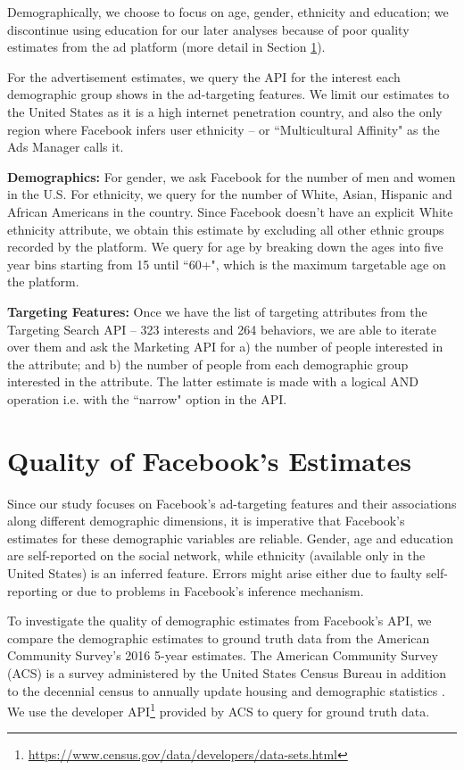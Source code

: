 Demographically, we choose to focus on age, gender, ethnicity and education; we discontinue using education for our later analyses because of poor quality estimates from the ad platform (more detail in Section \ref{sec:fb_quality}).

For the advertisement estimates, we query the API for the interest each demographic group shows in the ad-targeting features. We limit our estimates to the United States as it is a high internet penetration country, and also the only region where Facebook infers user ethnicity -- or ``Multicultural Affinity" as the Ads Manager calls it.

\textbf{Demographics:} For gender, we ask Facebook for the number of men and women in the U.S. For ethnicity, we query for the number of White, Asian, Hispanic and African Americans in the country. Since Facebook doesn't have an explicit White ethnicity attribute, we obtain this estimate by excluding all other ethnic groups recorded by the platform. We query for age by breaking down the ages into five year bins starting from 15 until ``60+", which is the maximum targetable age on the platform.

\textbf{Targeting Features:} Once we have the list of targeting attributes from the Targeting Search API -- 323 interests and 264 behaviors, we are able to iterate over them and ask the Marketing API for a) the number of people interested in the attribute; and b) the number of people from each demographic group interested in the attribute. The latter estimate is made with a logical AND operation i.e. with the ``narrow" option in the API.

\section{Quality of Facebook's Estimates} \label{sec:fb_quality}
Since our study focuses on Facebook's ad-targeting features and their associations along different demographic dimensions, it is imperative that Facebook's estimates for these demographic variables are reliable. Gender,  age and education are self-reported on the social network, while ethnicity (available only in the United States) is an inferred feature. Errors might arise either due to faulty self-reporting or due to problems in Facebook's inference mechanism.

To investigate the quality of demographic estimates from Facebook's API, we compare the demographic estimates to ground truth data from the American Community Survey's 2016 5-year estimates. The American Community Survey (ACS) is a survey administered by the United States Census Bureau in addition to the decennial census to annually update housing and demographic statistics \cite{acs2017info}. We use the developer API\footnote{\url{https://www.census.gov/data/developers/data-sets.html}} provided by ACS to query for ground truth data.


